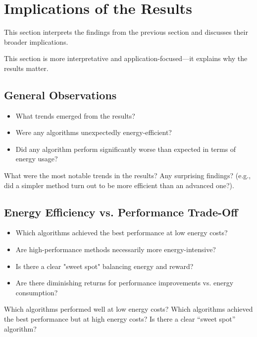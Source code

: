 \section{Implications of the Results}
\label{sec:implications_results}
This section interprets the findings from the previous section and discusses their broader implications.

This section is more interpretative and application-focused—it explains why the results matter.


\subsection{General Observations}
\begin{itemize}
	\item What trends emerged from the results?
	\item Were any algorithms unexpectedly energy-efficient?
	\item Did any algorithm perform significantly worse than expected in terms of energy usage?	
\end{itemize}
What were the most notable trends in the results?
Any surprising findings? (e.g., did a simpler method turn out to be more efficient than an advanced one?).

\subsection{Energy Efficiency vs. Performance Trade-Off}
\begin{itemize}
	\item Which algorithms achieved the best performance at low energy costs?
	\item Are high-performance methods necessarily more energy-intensive?
	\item Is there a clear "sweet spot" balancing energy and reward?
	\item Are there diminishing returns for performance improvements vs. energy consumption?
\end{itemize}
Which algorithms performed well at low energy costs?
Which algorithms achieved the best performance but at high energy costs?
Is there a clear “sweet spot” algorithm?

